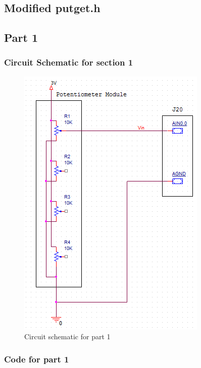 \documentclass[12pt]{article}
\begin{document}
\subsection{Modified putget.h}
	
\subsection{Part 1}
	\subsubsection{Circuit Schematic for section 1}
		\begin{figure}[H]
			\centering
			\includegraphics[]{Part1.png}
			\caption{Circuit schematic for part 1}
			\label{schematic1}
		\end{figure} 
		\pagebreak
	\subsubsection{Code for part 1}
		
\end{document}
